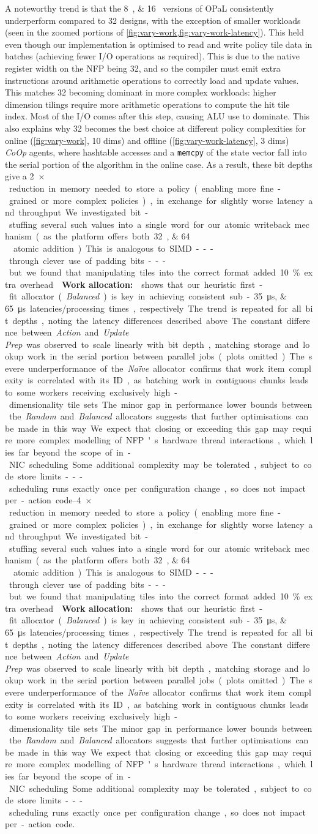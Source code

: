 \documentclass[
sigconf,natbib=false
]{acmart}
\newcommand{\fakepara}[1]{\noindent\textbf{#1:}}
\newcommand{\approachshort}{OPaL}
\newcommand{\Coopfw}{\emph{CoOp}}
\begin{document}
A noteworthy trend is that the \SIlist{8;16}{\bit} versions of \approachshort{} consistently underperform compared to \SI{32}{\bit} designs, with the exception of smaller workloads (seen in the zoomed portions of \cref{fig:vary-work,fig:vary-work-latency}).
This held even though our implementation is optimised to read and write policy tile data in batches (achieving fewer I/O operations as required).
This is due to the native register width on the NFP being \SI{32}{\bit}, and so the compiler must emit extra instructions around arithmetic operations to correctly load and update values.
This matches \SI{32}{\bit} becoming dominant in more complex workloads: higher dimension tilings require more arithmetic operations to compute the hit tile index.
Most of the I/O comes after this step, causing ALU use to dominate.
This also explains why \SI{32}{\bit} becomes the best choice at different policy complexities for online (\cref{fig:vary-work}, 10 dims) and offline (\cref{fig:vary-work-latency}, 3 dims) \Coopfw{} agents, where hashtable accesses and a \texttt{memcpy} of the state vector fall into the serial portion of the algorithm in the online case.
As a result, these bit depths give a \SIrange{2}{4}{$\times$} reduction in memory needed to store a policy (enabling more fine-grained or more complex policies), in exchange for slightly worse latency and throughput.
We investigated bit-stuffing several such values into a single word for our atomic writeback mechanism (as the platform offers both \SIlist{32;64
}{\bit} atomic addition).
This is analogous to SIMD---through clever use of padding bits---but we found that manipulating tiles into the correct format added \SI{10}{\percent} extra overhead.

\fakepara{Work allocation}
 shows that our heuristic first-fit allocator (\emph{Balanced}) is key in achieving consistent sub-\SIlist{35;65}{\micro\second} latencies/processing times, respectively.
The trend is repeated for all bit depths, noting the latency differences described above.
The constant difference between \emph{Action} and \emph{Update Prep} was observed to scale linearly with bit depth, matching storage and lookup work in the serial portion between parallel jobs (plots omitted).
The severe underperformance of the \emph{Na\"{i}ve} allocator confirms that work item complexity is correlated with its ID, as batching work in contiguous chunks leads to some workers receiving exclusively high-dimensionality tile sets.
The minor gap in performance lower bounds between the \emph{Random} and \emph{Balanced} allocators suggests that further optimisations can be made in this way.
We expect that closing or exceeding this gap may require more complex modelling of NFP's hardware thread interactions, which lies far beyond the scope of in-NIC scheduling.
Some additional complexity may be tolerated, subject to code store limits---scheduling runs exactly once per configuration change, so does not impact per-action code.
\end{document}
